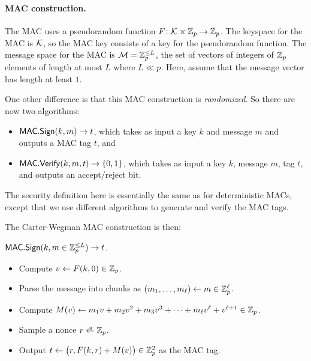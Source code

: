 \paragraph{MAC construction.}

The MAC uses a pseudorandom function 
$F \colon \mathcal{K} \times \mathbb{Z}_p \to \mathbb{Z}_p$.
The keyspace for the MAC is $\mathcal{K}$, so the MAC key consists of a key for 
the pseudorandom function.
The message space for the MAC is $\mathcal{M} = \mathbb{Z}_p^{\leq L}$,
the set of vectors of integers of $\mathbb{Z}_p$ elements of length
at most $L$ where $L \ll p$.
Here, assume that the message vector has length at least $1$.

One other difference is that this MAC construction is 
\emph{randomized}. So there are now two algorithms:
\begin{itemize}
  \item $\mathsf{MAC.Sign}(k, m) \to t$, which takes as input a key $k$ and message $m$
        and outputs a MAC tag $t$, and 
  \item $\mathsf{MAC.Verify}(k, m, t) \to \{0,1\}$, which takes as input a key $k$,
    message $m$, tag $t$, and outputs an accept/reject bit.
\end{itemize}
The security definition here is essentially the same as for deterministic MACs,
except that we use different algorithms to generate and verify the MAC tags.

The Carter-Wegman MAC construction is then:

\medskip
\noindent
$\mathsf{MAC.Sign}(k, m \in \mathbb{Z}^{\leq L}_p) \to t$.
\begin{itemize}[noitemsep]
  \item Compute $v \gets F(k, 0) \in \mathbb{Z}_p$.
  \item Parse the message into chunks as $(m_1, \dots, m_{\ell}) \gets m \in \mathbb{Z}_p^\ell$.
  \item Compute $M(v) \gets m_1 v + m_2 v^2 + m_3 v^3 + \cdots
        + m_{\ell} v^{\ell} + v^{\ell+1} \in \mathbb{Z}_p$. \\
  \item Sample a nonce $r \getsr \Z_p$.
  \item Output $t \gets \big(r, F(k, r) + M(v)\big) \in \mathbb{Z}^2_p$ as the MAC tag.
\end{itemize}

